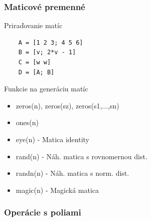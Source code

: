 \documentclass{beamer}
\begin{document}
\begin{frame}[fragile]
\frametitle{Maticové premenné}
  \begin{block}{Priraďovanie matíc}
  \begin{verbatim}
    A = [1 2 3; 4 5 6]
    B = [v; 2*v - 1]
    C = [w w]  
    D = [A; B]\end{verbatim}
  \end{block}  

\pause


  
  \begin{block}{Funkcie na generáciu matíc}
  \begin{itemize}
    \item zeros(n), zeros(sz), zeros(s1,...,sn)
    \item ones(n)
    \item eye(n) - Matica identity
    \item rand(n) - Náh. matica s rovnomernou dist.
    \item randn(n) - Náh. matica s norm. dist.
    \item magic(n) - Magická matica  
    \end{itemize}
  \end{block}  
  \end{frame}
  
\begin{frame}
  \frametitle{Operácie s poliami}
  \noindent{}
\end{frame}
\end{document}
